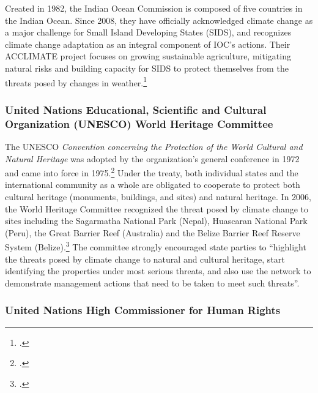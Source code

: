 Created in 1982, the Indian Ocean Commission is composed of five countries in the Indian Ocean.
Since 2008, they have officially acknowledged climate change as a major challenge for Small Island Developing States (SIDS), and recognizes climate change adaptation as an integral component of IOC's actions.
Their ACCLIMATE project focuses on growing sustainable agriculture, mitigating natural risks and building capacity for SIDS to protect themselves from the threats posed by changes in weather.\footcite[][]{IOCSIDS}



	\subsubsection{United Nations Educational, Scientific and Cultural Organization (UNESCO) World Heritage Committee}



The UNESCO \emph{Convention concerning the Protection of the World Cultural and Natural Heritage} was adopted by the organization's general conference in 1972 and came into force in 1975.\footcite[][]{UNESCOTreaty}
Under the treaty, both individual states and the international community as a whole are obligated to cooperate to protect both cultural heritage (monuments, buildings, and sites) and natural heritage.
In 2006, the World Heritage Committee recognized the threat posed by climate change to sites including the Sagarmatha National Park (Nepal), Huascaran National Park (Peru), the Great Barrier Reef (Australia) and the Belize Barrier Reef Reserve System (Belize).\footcite[][]{UNESCO2006}
The committee strongly encouraged state parties to ``highlight the threats posed by climate change to natural and cultural heritage, start identifying the properties under most serious threats, and also use the network to demonstrate management actions that need to be taken to meet such threats''.



	\subsubsection{United Nations High Commissioner for Human Rights}



